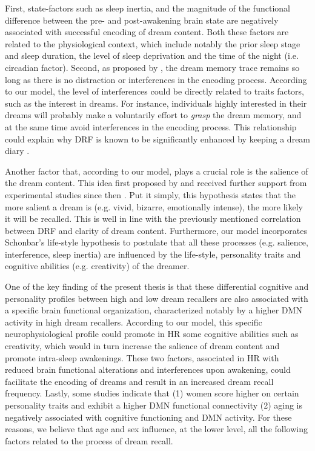 First, state-factors such as sleep inertia, and the magnitude of the functional difference between the pre- and post-awakening brain state \citep{koukkou_dreaming:_1983} are negatively associated with successful encoding of dream content. Both these factors are related to the physiological context, which include notably the prior sleep stage and sleep duration, the level of sleep deprivation and the time of the night (i.e. circadian factor). Second, as proposed by \citet{cohen_dream_1973}, the dream memory trace remains so long as there is no distraction or interferences in the encoding process. According to our model, the level of interferences could be directly related to traits factors, such as the interest in dreams. For instance, individuals highly interested in their dreams will probably make a voluntarily effort to \emph{grasp} the dream memory, and at the same time avoid interferences in the encoding process. This relationship could explain why DRF is known to be significantly enhanced by keeping a dream diary \citep{schredl_questionnaires_2002}.

Another factor that, according to our model, plays a crucial role is the salience of the dream content. This idea first proposed by \citet{cohen_test_1974} and received further support from experimental studies since then \citep{cipolli_bizarreness_1993, schredl_emotions_1998}. Put it simply, this hypothesis states that the more salient a dream is (e.g. vivid, bizarre, emotionally intense), the more likely it will be recalled. This is well in line with the previously mentioned correlation between DRF and clarity of dream content. Furthermore, our model incorporates Schonbar's life-style hypothesis \citeyearpar{schonbar_differential_1965} to postulate that all these processes (e.g. salience, interference, sleep inertia) are influenced by the life-style, personality traits and cognitive abilities (e.g. creativity) of the dreamer.

One of the key finding of the present thesis is that these differential cognitive and personality profiles between high and low dream recallers are also associated with a specific brain functional organization, characterized notably by a higher DMN activity in high dream recallers. According to our model, this specific neurophysiological profile could promote in HR some cognitive abilities such as creativity, which would in turn increase the salience of dream content and promote intra-sleep awakenings. These two factors, associated in HR with reduced brain functional alterations and interferences upon awakening, could facilitate the encoding of dreams and result in an increased dream recall frequency. Lastly, some studies indicate that (1) women score higher on certain personality traits and exhibit a higher DMN functional connectivity (2) aging is negatively associated with cognitive functioning and DMN activity. For these reasons, we believe that age and sex influence, at the lower level, all the following factors related to the process of dream recall.


